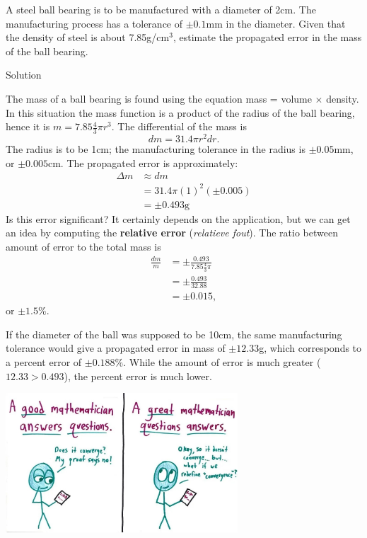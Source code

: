 \begin{example}\label{ex_diffal4}
A steel ball bearing is to be manufactured with a diameter of 2cm. The manufacturing process has a tolerance of $\pm 0.1$mm in the diameter. Given that the density of steel is about 7.85g/cm$^3$, estimate the propagated error in the mass of the ball bearing.

Solution 

The mass of a ball bearing is found using the equation mass = volume $\times$ density. In this situation the mass function is a product of the radius of the ball bearing, hence it is $m = 7.85\frac43\pi r^3$. The differential of the mass is $$dm = 31.4\pi r^2 dr.$$ The radius is to be 1cm; the manufacturing tolerance in the radius is $\pm 0.05$mm, or $\pm 0.005$cm. The propagated error is approximately:
\begin{align*}
\Delta m & \approx dm \\
				&= 31.4\pi (1)^2 (\pm 0.005) \\
				&= \pm 0.493\text{g}
\end{align*}
Is this error significant? It certainly depends on the application, but we can get an idea by computing the \textbf{relative error} (\textit{relatieve fout}). The ratio between amount of error to the total mass is
\begin{align*}
\frac{dm}{m} &= \pm \frac{0.493}{7.85\frac43\pi} \\[0.2cm]
							&=\pm \frac{0.493}{32.88}\\[0.2cm]
							&=\pm 0.015,
\end{align*}
or $\pm 1.5$\%. 


If the diameter of the ball was supposed to be 10cm, the same manufacturing tolerance would give a propagated error in mass of $\pm12.33$g, which corresponds to a percent error of $\pm0.188$\%. While the amount of error is much greater ($12.33 > 0.493$), the percent error is much lower.
\end{example}

	\begin{center}
			\includegraphics[width=0.65\textwidth]{GreatMath_3.jpg}
	\end{center}
\fi

